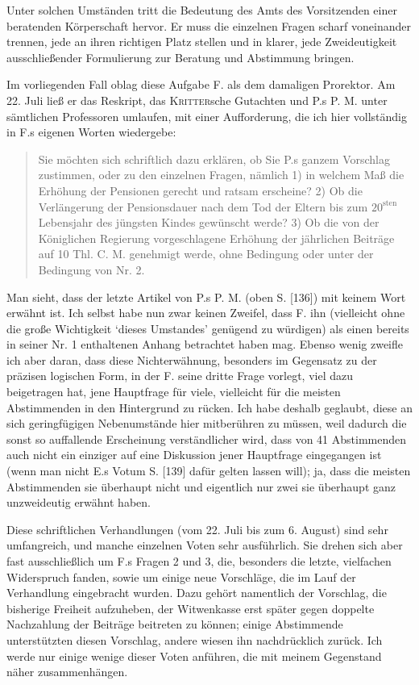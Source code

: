 \par{}
Unter solchen Umständen tritt die Bedeutung des Amts des Vorsitzenden einer beratenden Körperschaft hervor. Er muss die einzelnen Fragen scharf voneinander trennen, jede an ihren richtigen Platz stellen und in klarer, jede Zweideutigkeit ausschließender Formulierung zur Beratung und Abstimmung bringen.

Im vorliegenden Fall oblag diese Aufgabe F. als dem damaligen Prorektor. Am 22. Juli ließ er das Reskript, das \textsc{Kritter}sche Gutachten und P.s P. M. unter sämtlichen Professoren umlaufen, mit einer Aufforderung, die ich hier vollständig in F.s eigenen Worten wiedergebe:
\begin{quote}
Sie möchten sich schriftlich dazu erklären, ob Sie P.s ganzem Vorschlag zustimmen, oder zu den einzelnen Fragen, nämlich 1) in welchem Maß die Erhöhung der Pensionen gerecht und ratsam erscheine? 2) Ob die Verlängerung der Pensionsdauer nach dem Tod der Eltern bis zum \(20^{\text{sten}}\) Lebensjahr des jüngsten Kindes gewünscht werde? 3) Ob die von der Königlichen Regierung vorgeschlagene Erhöhung der jährlichen Beiträge auf 10 Thl. C. M. genehmigt werde, ohne Bedingung oder unter der Bedingung von Nr. 2.
\end{quote}
\noindent\hspace*{\parindent}Man sieht, dass der letzte Artikel von P.s P. M. (oben S. [136]) mit keinem Wort erwähnt ist. Ich selbst habe nun zwar keinen Zweifel, dass F. ihn (vielleicht ohne die große Wichtigkeit ‘dieses Umstandes’ genügend zu würdigen) als einen bereits in seiner Nr. 1 enthaltenen Anhang betrachtet haben mag. Ebenso wenig zweifle ich aber daran, dass diese Nichterwähnung, besonders im Gegensatz zu der präzisen logischen Form, in der F. seine dritte Frage vorlegt, viel dazu beigetragen hat, jene Hauptfrage für viele, vielleicht für die meisten Abstimmenden in den Hintergrund zu rücken. Ich habe deshalb geglaubt, diese an sich geringfügigen Nebenumstände hier mitberühren zu müssen, weil dadurch die sonst so auffallende Erscheinung verständlicher wird, dass von 41 Abstimmenden auch nicht ein einziger auf eine Diskussion jener Hauptfrage eingegangen ist (wenn man nicht E.s Votum S. [139] dafür gelten lassen will); ja, dass die meisten Abstimmenden sie überhaupt nicht und eigentlich nur zwei sie überhaupt ganz unzweideutig erwähnt haben.

Diese schriftlichen Verhandlungen (vom 22. Juli bis zum 6. August) sind sehr umfangreich, und manche einzelnen Voten sehr ausführlich. Sie drehen sich aber fast ausschließlich um F.s Fragen 2 und 3, die, besonders die letzte, vielfachen Widerspruch fanden, sowie um einige neue Vorschläge, die im Lauf der Verhandlung eingebracht wurden. Dazu gehört namentlich der Vorschlag, die bisherige Freiheit aufzuheben, der Witwenkasse erst später gegen doppelte Nachzahlung der Beiträge beitreten zu können; einige Abstimmende unterstützten diesen Vorschlag, andere wiesen ihn nachdrücklich zurück. Ich werde nur einige wenige dieser Voten anführen, die mit meinem Gegenstand näher zusammenhängen.

